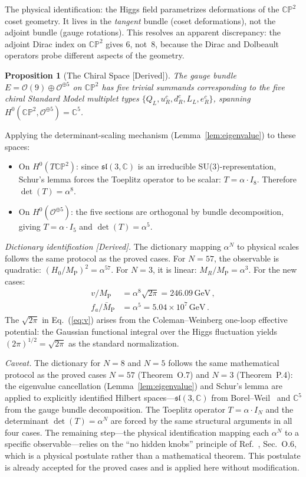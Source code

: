 \documentclass[aps,prd,twocolumn,superscriptaddress,showpacs,floatfix,nofootinbib]{revtex4-2}
\newtheorem{proposition}[theorem]{Proposition}
\theoremstyle{definition}
\theoremstyle{remark}
\newcommand{\CP}{\mathbb{CP}}
\newcommand{\MP}{M_{\mathrm{P}}}
\newcommand{\MPbar}{\bar{M}_{\mathrm{P}}}
\newcommand{\GeV}{\,\mathrm{GeV}}
\newcommand{\grade}[1]{\textsf{\footnotesize [#1]}}
\begin{document}
The physical identification: the Higgs field parametrizes
deformations of the $\CP^2$ coset geometry. It lives in the
\emph{tangent} bundle (coset deformations), not the adjoint
bundle (gauge rotations). This resolves an apparent
discrepancy: the adjoint Dirac index on $\CP^2$ gives $6$,
not~$8$, because the Dirac and Dolbeault operators probe
different aspects of the geometry.

\begin{proposition}[The Chiral Space \grade{Derived}]
\label{prop:chiral}
The gauge bundle $E = \mathcal{O}(9)\oplus\mathcal{O}^{\oplus 5}$
on $\CP^2$ has five trivial summands corresponding to the
five chiral Standard Model multiplet types
$\{Q_L, u_R^c, d_R^c, L_L, e_R^c\}$, spanning
$H^0(\CP^2,\mathcal{O}^{\oplus 5})=\mathbb{C}^5$.
\end{proposition}

Applying the determinant-scaling mechanism
(Lemma~\ref{lem:eigenvalue}) to these spaces:

\begin{itemize}
\item On $H^0(T\CP^2)$: since $\mathfrak{sl}(3,\mathbb{C})$
  is an irreducible SU(3)-representation, Schur's lemma forces
  the Toeplitz operator to be scalar: $T = \alpha\cdot I_8$.
  Therefore $\det(T) = \alpha^8$.
\item On $H^0(\mathcal{O}^{\oplus 5})$: the five sections are
  orthogonal by bundle decomposition, giving
  $T = \alpha\cdot I_5$ and $\det(T) = \alpha^5$.
\end{itemize}

\emph{Dictionary identification \grade{Derived}.}
The dictionary mapping $\alpha^N$ to physical scales follows
the same protocol as the proved cases. For $N=57$, the
observable is quadratic: $(H_0/\MP)^2 = \alpha^{57}$.
For $N=3$, it is linear: $M_R/\MP = \alpha^3$.
For the new cases:
\begin{align}
v/\MP &= \alpha^8\sqrt{2\pi} = 246.09\GeV\,,
  \label{eq:v}\\
f_a/\MPbar &= \alpha^5 = 5.04\times 10^7\GeV\,.
  \label{eq:fa}
\end{align}
The $\sqrt{2\pi}$ in Eq.~(\ref{eq:v}) arises from the
Coleman--Weinberg one-loop effective potential: the Gaussian
functional integral over the Higgs fluctuation yields
$(2\pi)^{1/2} = \sqrt{2\pi}$ as the standard normalization.

\emph{Caveat.} The dictionary for $N=8$ and $N=5$ follows
the same mathematical protocol as the proved cases $N=57$
(Theorem~O.7) and $N=3$ (Theorem~P.4): the eigenvalue
cancellation (Lemma~\ref{lem:eigenvalue}) and
Schur's lemma are applied to explicitly identified
Hilbert spaces---$\mathfrak{sl}(3,\mathbb{C})$ from
Borel--Weil~\cite{BorelWeil1954} and $\mathbb{C}^5$
from the gauge bundle decomposition. The Toeplitz
operator $T=\alpha\cdot I_N$ and the determinant
$\det(T)=\alpha^N$ are forced by the same structural
arguments in all four cases. The remaining step---the
physical identification mapping each $\alpha^N$ to a
specific observable---relies on the ``no hidden knobs''
principle of Ref.~\cite{Alcock2025}, Sec.~O.6, which is
a physical postulate rather than a mathematical theorem.
This postulate is already accepted for the proved cases
and is applied here without modification.
\end{document}
